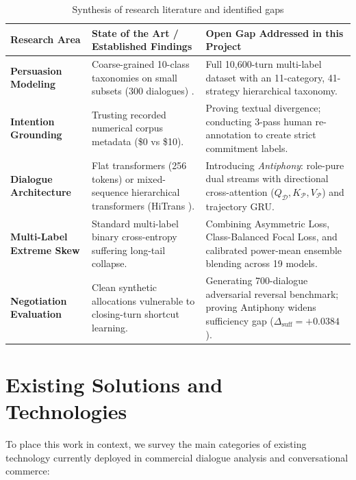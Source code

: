 \begin{table}[htbp]
  \centering
  \small
  \caption{Synthesis of research literature and identified gaps}
  \label{tab:lit-gap}
  \begin{tabularx}{\textwidth}{l>{\hsize}Y>{\hsize}Y}
    \toprule
    \textbf{Research Area} & \textbf{State of the Art / Established Findings} & \textbf{Open Gap Addressed in this Project} \\
    \midrule
    \textbf{Persuasion Modeling} & Coarse-grained 10-class taxonomies on small subsets (300 dialogues) \cite{wang2019persuasion}. & Full 10,600-turn multi-label dataset with an 11-category, 41-strategy hierarchical taxonomy. \\
    \midrule
    \textbf{Intention Grounding} & Trusting recorded numerical corpus metadata (\$0 vs \$10). & Proving textual divergence; conducting 3-pass human re-annotation to create strict commitment labels. \\
    \midrule
    \textbf{Dialogue Architecture} & Flat transformers (256 tokens) or mixed-sequence hierarchical transformers (HiTrans \cite{li2020hitrans}). & Introducing \textit{Antiphony}: role-pure dual streams with directional cross-attention ($Q_{\mathcal{D}}, K_{\mathcal{P}}, V_{\mathcal{P}}$) and trajectory GRU. \\
    \midrule
    \textbf{Multi-Label Extreme Skew} & Standard multi-label binary cross-entropy suffering long-tail collapse. & Combining Asymmetric Loss, Class-Balanced Focal Loss, and calibrated power-mean ensemble blending across 19 models. \\
    \midrule
    \textbf{Negotiation Evaluation} & Clean synthetic allocations \cite{lewis2017deal} vulnerable to closing-turn shortcut learning. & Generating 700-dialogue adversarial reversal benchmark; proving Antiphony widens sufficiency gap ($\Delta_{\text{suff}} = +0.0384$). \\
    \bottomrule
  \end{tabularx}
\end{table}

\section{Existing Solutions and Technologies}
\label{sec:related}

To place this work in context, we survey the main categories of existing technology currently deployed in commercial dialogue analysis and conversational commerce:

